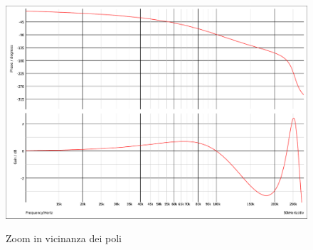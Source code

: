 \documentclass[a4paper,12pt]{report}
\begin{document}
\begin{figure}[!htb]
	\centering
	\includegraphics[width=.8\textwidth]{pictures/LCLC_adattato_zoom_osc.pdf}
	\label{fig:largenenough}
	\caption{\label{lul} \small Zoom in vicinanza dei poli}
\end{figure}
\end{document}
